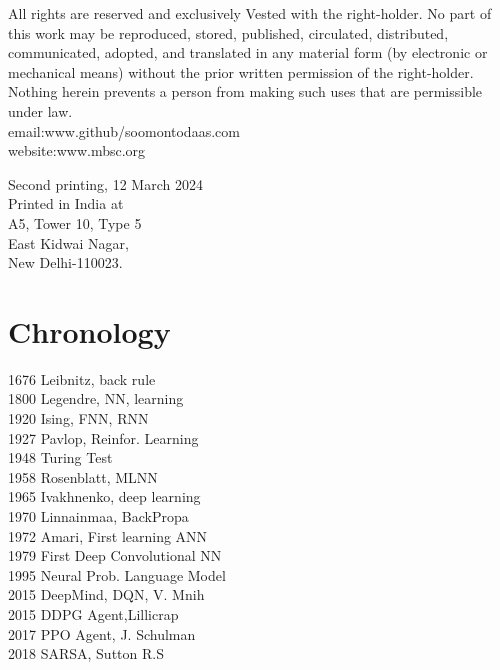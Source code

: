 \documentclass[]{article}
\begin{document}
\par All rights are reserved and exclusively
Vested with the right-holder. No part of this work may be reproduced, stored, published, circulated, distributed, communicated, adopted, and translated in any material form (by electronic or mechanical means) without the prior written permission of the right-holder. Nothing herein prevents a person from making such uses that are permissible under law.\\
email:www.github/soomontodaas.com\\
website:www.mbsc.org\\
\vspace{5mm}

Second printing, 12 March 2024\\ Printed in India at\\ A5, Tower 10, Type 5\\East Kidwai Nagar,\\New Delhi-110023.




\newpage
\RaggedRight
\section*{Chronology \cite{schmidhuber2022annotated}}
\normalsize
1676 Leibnitz, back rule \\
1800 Legendre, NN,  learning\\
1920 Ising, FNN, RNN\\
1927 Pavlop, Reinfor. Learning\\
1948 Turing Test\\
1958 Rosenblatt, MLNN\\
1965 Ivakhnenko, deep learning\\
1970 Linnainmaa, BackPropa\\
1972 Amari, First learning ANN\\
1979 First Deep Convolutional NN \\
1995 Neural Prob. Language Model\\
2015 DeepMind, DQN, V. Mnih\\
2015 DDPG Agent,Lillicrap\\
2017 PPO Agent, J. Schulman\\
2018 SARSA, Sutton R.S\\ 


\newpage
\pagestyle{fancy}
\fancyhead{}\fancyfoot{}
\fancyfoot[C]{ \thepage}
\renewcommand{\headrulewidth}{0pt}
\renewcommand{\footrulewidth}{0pt}
\end{document}
